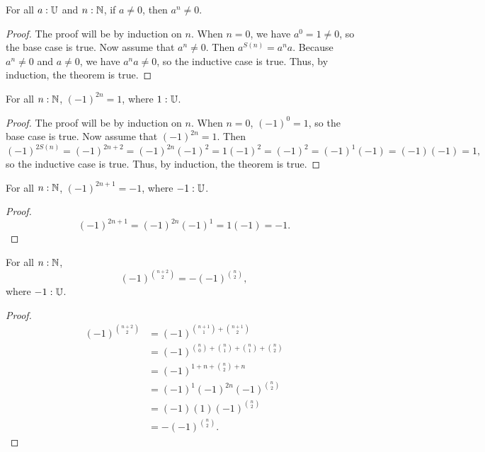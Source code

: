 \documentclass[../math.tex]{subfiles}
\begin{document}
\begin{theorem} \label{nat-pow-not-zero}
    For all $a : \mathbb{U}$ and $n : \mathbb{N}$, if $a \neq 0$, then $a^n \neq 0$.
\end{theorem}
\begin{proof}
    The proof will be by induction on $n$.  When $n = 0$, we have $a^0 = 1 \neq
    0$, so the base case is true.  Now assume that $a^n \neq 0$.  Then $a^{S(n)}
    = a^na.$  Because $a^n \neq 0$ and $a \neq 0$, we have $a^na \neq 0$, so the
    inductive case is true.  Thus, by induction, the theorem is true.
\end{proof}

\begin{theorem} \label{nat-pow-neg-even}
    For all $n : \mathbb{N}$, $(-1)^{2n} = 1$, where $1 : \mathbb{U}$.
\end{theorem}
\begin{proof}
    The proof will be by induction on $n$.  When $n = 0$, $(-1)^0 = 1$, so the
    base case is true.  Now assume that $(-1)^{2n} = 1$.  Then
    \[
        (-1)^{2S(n)} = (-1)^{2n + 2} = (-1)^{2n} (-1)^2 = 1 (-1)^2 = (-1)^2 =
        (-1)^1 (-1) = (-1) (-1) = 1,
    \]
    so the inductive case is true.  Thus, by induction, the theorem is true.
\end{proof}

\begin{theorem} \label{nat-pow-neg-odd}
    For all $n : \mathbb{N}$, $(-1)^{2n + 1} = -1$, where $-1 : \mathbb{U}$.
\end{theorem}
\begin{proof}
    \[
        (-1)^{2n + 1} = (-1)^{2n} (-1)^1 = 1 (-1) = -1.
    \]
\end{proof}

\begin{theorem} \label{nat-pow-neg-binom2}
    For all $n : \mathbb{N}$,
    \[
        (-1)^{\binom{n + 2}{2}} = -(-1)^{\binom{n}{2}},
    \]
    where $-1 : \mathbb{U}$.
\end{theorem}
\begin{proof}
    \begin{align*}
        (-1)^{\binom{n + 2}{2}}
        &= (-1)^{\binom{n + 1}{1} + \binom{n + 1}{2}} \\
        &= (-1)^{\binom{n}{0} + \binom{n}{1} + \binom{n}{1} + \binom{n}{2}} \\
        &= (-1)^{1 + n + \binom{n}{2} + n} \\
        &= (-1)^{1} (-1)^{2n} (-1)^{\binom{n}{2}} \\
        &= (-1) (1) (-1)^{\binom{n}{2}} \\
        &= -(-1)^{\binom{n}{2}}.
    \end{align*}
\end{proof}
\end{document}
